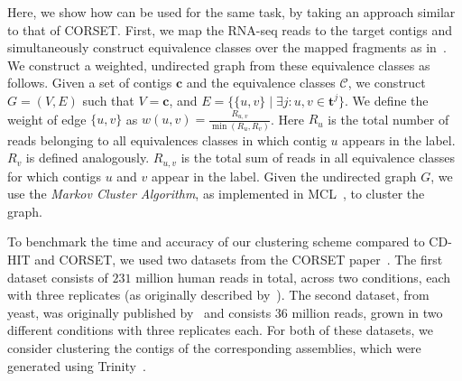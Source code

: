 Here, we show how \rapmap can be used for the same task, by taking an approach similar to that of CORSET.  First, we map the RNA-seq reads to the target contigs and simultaneously construct equivalence classes over the mapped fragments as in~. We construct a weighted, undirected graph from these equivalence classes as follows. Given a set of contigs $\mathbf{c}$ and the equivalence classes $\mathcal{C}$, we construct $G=(V,E)$ such that $V = \mathbf{c}$, and $E = \{\{u,v\} \mid \exists j: u,v \in \mathbf{t}^{j}\}$.  We define the weight of edge $\{u, v\}$ as $w(u,v) = \frac{R_{u,v}}{\min\left(R_u,R_v\right)}$. Here $R_u$ is the total number of reads belonging to all equivalences classes in which contig $u$ appears in the label. $R_v$ is defined analogously. $R_{u,v}$ is the total sum of reads in all equivalence classes for which contigs $u$ and $v$ appear in the label. Given the undirected graph $G$, we use the \textit{Markov Cluster Algorithm}, as implemented in MCL~\citep{van2000cluster}, to cluster the graph.

To benchmark the time and accuracy of our clustering scheme compared to CD-HIT and CORSET, we used two datasets from the CORSET paper~\citep{corset}. The first dataset consists of $231$ million human reads in total, across two conditions, each with three replicates (as originally described by~\citet{trapnell2013differential}). The second dataset, from yeast, was originally published by~\citet{nookaew2012comprehensive} and consists $36$ million reads, grown in two different conditions with three replicates each. For both of these datasets, we consider clustering the contigs of the corresponding \denovo assemblies, which were generated using Trinity~\citep{trinity}.

